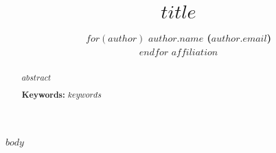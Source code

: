 \documentclass[10pt,letterpaper]{article}
\title{$title$}
\author{$for(author)$
  {\large \bf $author.name$ ($author.email$)}\\
  $endfor$
  $affiliation$}
\begin{document}
\maketitle


\begin{abstract}
$abstract$

\textbf{Keywords:} 
$keywords$
\end{abstract}


$body$



\renewcommand{\bibliographytypesize}{\small}
\setlength{\bibleftmargin}{.125in}
\setlength{\bibindent}{-\bibleftmargin}
\setlength{\bibhang}{\bibleftmargin}

\end{document}
